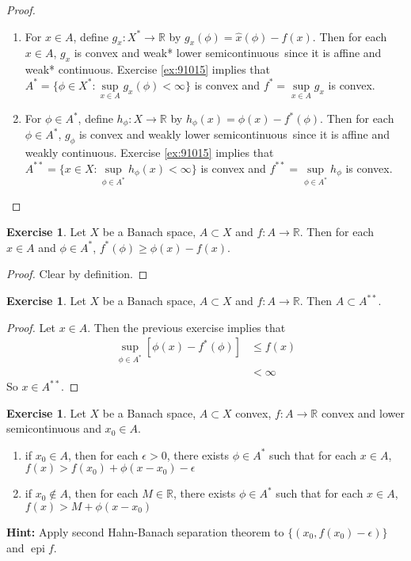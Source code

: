 \documentclass[12pt]{amsart}
\theoremstyle{definition}
\newtheorem{ex}[definition]{Exercise}
\newcommand{\ep}{\epsilon}
\newcommand{\R}{\mathbb{R}}
\newcommand{\tbf}[1]{\textbf{#1}}
\newcommand{\lsc}{lower semicontinuous}
\DeclareMathOperator{\epi}{epi}
\DeclareMathOperator*{\0}{\mbf{0}}
\DeclareMathOperator*{\1}{\mbf{1}}
\newcommand{\lex}[1]{\label{ex:#1}}
\newcommand{\rex}[1]{Exercise \ref{ex:#1}}
\begin{document}
	\begin{proof} \
		\begin{enumerate}
			\item For $x \in A$, define $g_x: X^* \rightarrow \R$ by $g_x(\phi) = \hat{x}(\phi) - f(x)$. Then for each $x \in A$, $g_x$ is convex and weak* \lsc \, since it is affine and weak* continuous. \rex{91015} implies that $A^* = \{\phi \in X^*: \sup\limits_{x \in A} g_x(\phi) < \infty \}$ is convex and  $f^* = \sup\limits_{x \in A} g_x$ is convex.
			\item For $\phi \in A^*$, define $h_{\phi}: X \rightarrow \R$ by $h_{\phi}(x) = \phi(x) - f^{*}(\phi)$. Then for each $\phi \in A^*$, $g_{\phi}$ is convex and weakly \lsc \, since it is affine and weakly continuous. \rex{91015} implies that $A^{**} = \{x \in X: \sup\limits_{\phi \in A^*} h_{\phi}(x) < \infty \}$ is convex and   $f^{**} = \sup\limits_{\phi \in A^*} h_{\phi}$ is convex. 
		\end{enumerate}		 
	\end{proof}
	
	\begin{ex} \lex{}
		Let $X$ be a Banach space, $A \subset X$ and $f:A \rightarrow \R$. Then for each $x \in A$ and $\phi \in A^*$, $f^*(\phi) \geq \phi(x) - f(x)$.	
	\end{ex}
	
	\begin{proof}
	Clear by definition.
	\end{proof}
	
	\begin{ex} \lex{}
	Let $X$ be a Banach space, $A \subset X$ and $f:A \rightarrow \R$. Then $A \subset A^{**}$.
	\end{ex}

	\begin{proof}
		Let $x \in A$. Then the previous exercise implies that
		\begin{align*}
			\sup_{\phi \in A^*} [\phi(x) - f^{*}(\phi)] 
			& \leq f(x) \\
			& < \infty  
		\end{align*}
		So $x \in A^{**}$.
	\end{proof}

	\begin{ex}
		Let $X$ be a Banach space, $A \subset X$ convex, $f:A \rightarrow \R$ convex and lower semicontinuous and $x_0 \in A$. 
		\begin{enumerate}
			\item if $x_0 \in A$, then for each $\ep >0$, there exists $\phi \in A^*$ such that for each $x \in A$, $f(x) > f(x_0) + \phi(x - x_0) - \ep$
			\item if $x_0 \not \in A$, then for each $M \in \R$, there exists $\phi \in A^*$ such that for each $x \in A$, $f(x) > M + \phi(x - x_0)$
		\end{enumerate}
	\tbf{Hint:} Apply second Hahn-Banach separation theorem to $\{(x_0, f(x_0) - \ep)\}$ and $\epi f$.
	\end{ex}
\end{document}

